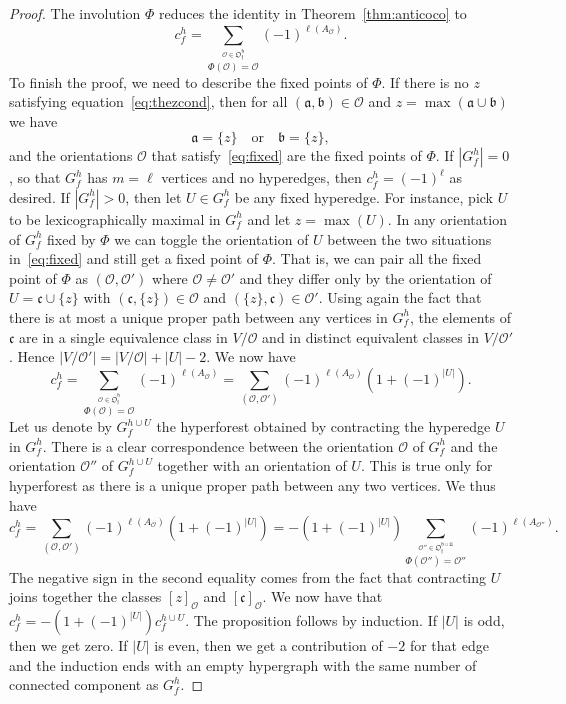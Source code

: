 \documentclass[ALCO,ThmDefs,Unicode,epreuves]{cedram}
\begin{document}
\begin{exam}
\begin{proof}
The involution $\Phi$ reduces the identity in Theorem~\ref{thm:anticoco} to
 $$ c_f^h = \sum_{\stackrel{\mathcal{O}\in \mathfrak{O_f^h}} %
 {\Phi(\mathcal{O})=\mathcal{O}}} (-1)^{\ell(A_{\mathcal{O}})}.$$
 To finish the proof, we need to describe the fixed points of $\Phi$. If there is no $z$ satisfying equation~\eqref{eq:thezcond}, then for all $(\mathfrak{a},\mathfrak{b})\in \mathcal{O}$ and $z=\max(\mathfrak{a}\cup \mathfrak{b})$ we have 
 \begin{equation}\label{eq:fixed}
 \mathfrak{a}=\{z\} \quad \text{or} \quad \mathfrak{b}=\{z\},
 \end{equation}
 and the orientations $\mathcal{O}$ that satisfy~\eqref{eq:fixed} are the fixed points of $\Phi$. If $|G_f^h|=0$, so that $G_f^h$ has $m=\ell$ vertices and no hyperedges, then $c_f^h=(-1)^\ell$ as desired. If $|G_f^h|>0$, then let $U\in G_f^h$ be any fixed hyperedge. For instance, pick $U$ to be lexicographically maximal in $G_f^h$ and let $z=\max(U)$.
 In any orientation of $G_f^h$ fixed by $\Phi$ we can toggle the orientation of $U$ between the two situations in~\eqref{eq:fixed} and still get a fixed point of $\Phi$.
 That is, we can pair all the fixed point of $\Phi$ as $(\mathcal{O},\mathcal{O}')$ where $\mathcal{O}\ne\mathcal{O}'$ and they differ only by the orientation of $U=\mathfrak{c}\cup\{z\}$ with $(\mathfrak{c},\{z\})\in \mathcal{O}$ and $(\{z\},\mathfrak{c})\in \mathcal{O}'$. Using again the fact that there is at most a unique proper path between any vertices in $G_f^h$,
 the elements of $\mathfrak{c}$ are in a single equivalence class in $V/\mathcal{O}$ and in distinct equivalent classes in $V/\mathcal{O}'$. Hence $|V/\mathcal{O}'|=|V/\mathcal{O}|+|U|-2$.
 We now have 
 $$ c_f^h = 
 \sum_{\stackrel{\mathcal{O}\in \mathfrak{O_f^h}}{\Phi(\mathcal{O})=\mathcal{O}}}
 (-1)^{\ell(A_{\mathcal{O}})}
 = \sum_{(\mathcal{O},\mathcal{O}')} (-1)^{\ell(A_{\mathcal{O}})} (1+(-1)^{|U|}).
 $$
Let us denote by $G_f^{h\cup U}$ the hyperforest obtained by contracting the hyperedge $U$ in $G_f^h$. There is a clear correspondence between the orientation $\mathcal{O}$ of $G_f^h$
and the orientation $\mathcal{O}''$ of $G_f^{h\cup U}$ together with an orientation of $U$. This is true only for hyperforest as there is a unique proper path between any two vertices.
We thus have 
 $$ c_f^h = \sum_{(\mathcal{O},\mathcal{O}')} (-1)^{\ell(A_{\mathcal{O}})} (1+(-1)^{|U|})
 =- (1+(-1)^{|U|}) \sum_{\stackrel{\mathcal{O}''\in \mathfrak{O_f^{h\cup U}}} 
 {\Phi(\mathcal{O}'')=\mathcal{O}''}} (-1)^{\ell(A_{\mathcal{O}''})}.
 $$
The negative sign in the second equality comes from the fact that contracting $U$ joins together the classes $[z]_{\mathcal{O}}$ and $[\mathfrak{c}]_{\mathcal{O}}$.
 We now have that
 $ c_f^h = -(1+(-1)^{|U|}) c_f^{h\cup U} $. The proposition follows by induction. If $|U|$ is odd, then we get zero. If $|U|$ is even,
 then we get a contribution of $-2$ for that edge and the induction ends with an empty hypergraph with the same number of connected component as $G_f^h$.
 \end{proof}
\end{exam}
\end{document}
